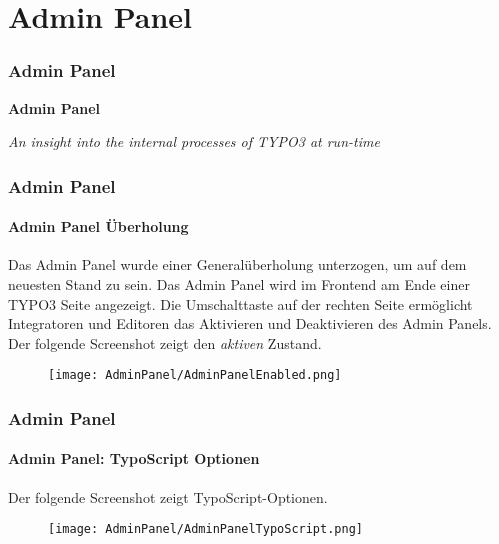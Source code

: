 %

\section{Admin Panel}
\begin{frame}[fragile]
	\frametitle{Admin Panel}

	\begin{center}\huge{\color{typo3darkgrey}\textbf{Admin Panel}}\end{center}
	\begin{center}\large{\textit{An insight into the internal processes of TYPO3 at run-time}}\end{center}

\end{frame}


\begin{frame}[fragile]
	\frametitle{Admin Panel}
	\framesubtitle{Admin Panel Überholung}

    Das Admin Panel wurde einer Generalüberholung unterzogen, um auf dem neuesten 
    Stand zu sein.
	\newline\newline
	Das Admin Panel wird im Frontend am Ende einer TYPO3 Seite angezeigt. Die Umschalttaste 
	auf der rechten Seite ermöglicht Integratoren und Editoren das Aktivieren und Deaktivieren
	des Admin Panels. Der folgende Screenshot zeigt den \textit{aktiven} Zustand.
	\vspace{0.8cm}
	\begin{figure}
		\texttt{[image: AdminPanel/AdminPanelEnabled.png]}
	\end{figure}

\end{frame}


\begin{frame}[fragile]
	\frametitle{Admin Panel}
	\framesubtitle{Admin Panel: TypoScript Optionen}

	Der folgende Screenshot zeigt TypoScript-Optionen.

	\begin{figure}
		\texttt{[image: AdminPanel/AdminPanelTypoScript.png]}
	\end{figure}

\end{frame}

